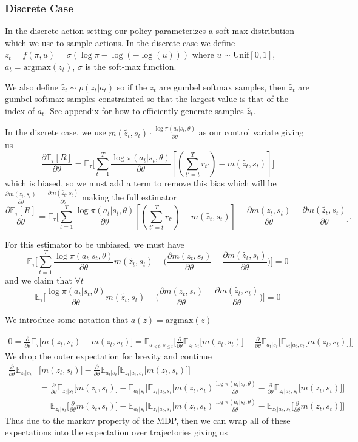 \documentclass{article}
\newcommand{\E}{\mathbb{E}}
\newcommand{\LL}[1]{\frac{\log \pi(a_{#1}| s_{#1}, \theta)}{\partial \theta}}
\newcommand{\PT}{\frac{\partial}{\partial \theta}}
\begin{document}
\subsubsection{Discrete Case}
In the discrete action setting our policy parameterizes a soft-max distribution which we use to sample actions. 
In the discrete case we define $z_t = f(\pi, u) = \sigma (\log\pi - \log(-\log(u)))$ where $u\sim \text{Unif}[0, 1]$, $a_t = \text{argmax}(z_t)$, $\sigma$ is the soft-max function.

We also define $\tilde{z_t} \sim p(z_t|a_t)$ so if the $z_t$ are gumbel softmax samples, then $\tilde{z_t}$ are gumbel softmax samples constrainted so that the largest value is that of the index of $a_t$. See appendix for how to efficiently generate samples $\tilde{z_t}$. 

In the discrete case, we use $m(\tilde{z_t}, s_t)\cdot \LL{t}$ as our control variate giving us $$\frac{\partial \E_\tau[R]}{\partial \theta} = \E_\tau\Big[\sum_{t=1}^T \LL{t} [(\sum_{t'=t}^T r_{t'}) - m(\tilde{z_t}, s_t)]\Big]$$ which is biased, so we must add a term to remove this bias which will be $\frac{\partial m(z_t, s_t)}{\partial\theta} - \frac{\partial m(\tilde{z_t}, s_t)}{\partial\theta}$ making the full estimator
$$\frac{\partial \E_\tau[R]}{\partial \theta} = \E_\tau\Big[\sum_{t=1}^T \LL{t} [(\sum_{t'=t}^T r_{t'}) - m(\tilde{z_t}, s_t)] + \frac{\partial m(z_t, s_t)}{\partial\theta} -  \frac{\partial m(\tilde{z_t}, s_t)}{\partial\theta}\Big].$$ 

For this estimator to be unbiased, we must have $$\E_\tau\Big[\sum_{t=1}^T \LL{t} m(\tilde{z_t}, s_t) - \Big(\frac{\partial m(z_t, s_t)}{\partial\theta} - \frac{\partial m(\tilde{z_t}, s_t)}{\partial\theta}\Big)\Big] = 0$$ and we claim that $\forall t$  $$\E_\tau\Big[ \LL{t} m(\tilde{z_t}, s_t) - \Big(\frac{\partial m(z_t, s_t)}{\partial\theta} - \frac{\partial m(\tilde{z_t}, s_t)}{\partial\theta}\Big)\Big] = 0$$ 

We introduce some notation that $a(z) = \text{argmax}(z)$

\begin{align}
0 = \PT \E_\tau\Big[ m(z_t, s_t) - m(z_t, s_t) \Big] = \E_{a_{<t},s_{\leq t}}\Big[ \PT \E_{z_t|s_t} \Big[ m(z_t, s_t) \Big] -  \PT \E_{a_t|s_t} \Big[ \E_{z_t|a_t, s_t}\Big[ m(z_t, s_t)\Big] \Big]\Big]
\end{align}
We drop the outer expectation for brevity and continue
\begin{align}
\PT \E_{z_t|s_t} &\Big[ m(z_t, s_t) \Big] -  \PT \E_{a_t|s_t} \Big[ \E_{z_t|a_t, s_t}\Big[ m(z_t, s_t)\Big] \Big]\\
&= \PT \E_{z_t|s_t} \Big[ m(z_t, s_t) \Big] - \E_{a_t|s_t} \Big[ \E_{z_t|a_t, s_t}\Big[m(z_t, s_t) \LL{t} -\PT \E_{z_t|a_t, s_t}\Big[m(z_t, s_t)  \Big] \Big]\\
&= \E_{z_t|s_t} \Big[ \PT m(z_t, s_t) \Big] - \E_{a_t|s_t} \Big[ \E_{z_t|a_t, s_t}\Big[m(z_t, s_t) \LL{t} - \E_{z_t|a_t, s_t}\Big[\PT m(z_t, s_t)  \Big] \Big]
\end{align}
Thus due to the markov property of the MDP, then we can wrap all of these expectations into the expectation over trajectories giving us
\end{document}

